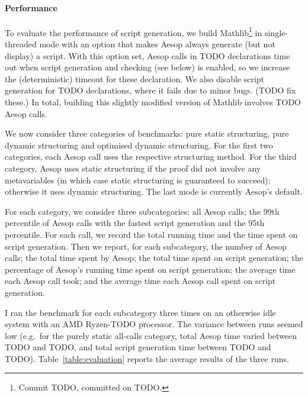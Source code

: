 \documentclass[sigplan,10pt,anonymous,review]{acmart}
\begin{document}
\paragraph{Performance}
To evaluate the performance of script generation, we build Mathlib\footnote{Commit TODO, committed on TODO.} in single-threaded mode with an option that makes Aesop always generate (but not display) a script.
With this option set, Aesop calls in TODO declarations time out when script generation and checking (see below) is enabled, so we increase the (deterministic) timeout for these declaration.
We also disable script generation for TODO declarations, where it fails due to minor bugs. (TODO fix these.)
In total, building this slightly modified version of Mathlib involves TODO Aesop calls.

We now consider three categories of benchmarks: pure static structuring, pure dynamic structuring and optimised dynamic structuring.
For the first two categories, each Aesop call uses the respective structuring method.
For the third category, Aesop uses static structuring if the proof did not involve any metavariables (in which case static structuring is guaranteed to succeed); otherwise it uses dynamic structuring.
The last mode is currently Aesop's default.

For each category, we consider three subcategories: all Aesop calls; the 99th percentile of Aesop calls with the fastest script generation and the 95th percentile.
For each call, we record the total running time and the time spent on script generation.
Then we report, for each subcategory, the number of Aesop calls; the total time spent by Aesop; the total time spent on script generation; the percentage of Aesop's running time spent on script generation; the average time each Aesop call took; and the average time each Aesop call spent on script generation.

I ran the benchmark for each subcategory three times on an otherwise idle system with an AMD Ryzen-TODO processor.
The variance between runs seemed low (e.g.\ for the purely static all-calls category, total Aesop time varied between TODO and TODO, and total script generation time between TODO and TODO).
Table~\ref{table:evaluation} reports the average results of the three runs.
\end{document}
